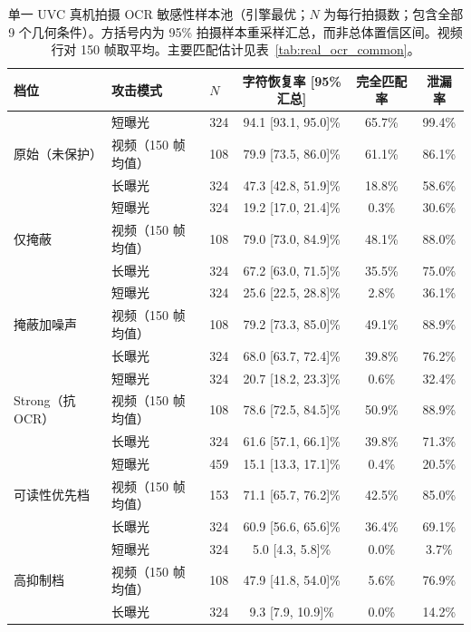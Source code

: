 \documentclass{ieeeaccess}
\begin{document}
\begin{table}[!t]
\caption{单一 UVC 真机拍摄 OCR 敏感性样本池（引擎最优；$N$ 为每行拍摄数；包含全部 9 个几何条件）。方括号内为 95\% 拍摄样本重采样汇总，而非总体置信区间。视频行对 150 帧取平均。主要匹配估计见表~\ref{tab:real_ocr_common}。}
\label{tab:real_ocr_full_pool}
\centering
\footnotesize
\begin{tabular}{lllccc}
\toprule
档位 & 攻击模式 & $N$ & 字符恢复率 [95\% 汇总] & 完全匹配率 & 泄漏率 \\
\midrule
\multirow{3}{*}{原始（未保护）}
 & 短曝光 & 324 & 94.1 [93.1, 95.0]\% & 65.7\% & 99.4\% \\
 & 视频（150 帧均值） & 108 & 79.9 [73.5, 86.0]\% & 61.1\% & 86.1\% \\
 & 长曝光 & 324 & 47.3 [42.8, 51.9]\% & 18.8\% & 58.6\% \\
\midrule
\multirow{3}{*}{仅掩蔽}
 & 短曝光 & 324 & 19.2 [17.0, 21.4]\% & 0.3\% & 30.6\% \\
 & 视频（150 帧均值） & 108 & 79.0 [73.0, 84.9]\% & 48.1\% & 88.0\% \\
 & 长曝光 & 324 & 67.2 [63.0, 71.5]\% & 35.5\% & 75.0\% \\
\midrule
\multirow{3}{*}{掩蔽加噪声}
 & 短曝光 & 324 & 25.6 [22.5, 28.8]\% & 2.8\% & 36.1\% \\
 & 视频（150 帧均值） & 108 & 79.2 [73.3, 85.0]\% & 49.1\% & 88.9\% \\
 & 长曝光 & 324 & 68.0 [63.7, 72.4]\% & 39.8\% & 76.2\% \\
\midrule
\multirow{3}{*}{Strong（抗 OCR）}
 & 短曝光 & 324 & 20.7 [18.2, 23.3]\% & 0.6\% & 32.4\% \\
 & 视频（150 帧均值） & 108 & 78.6 [72.5, 84.5]\% & 50.9\% & 88.9\% \\
 & 长曝光 & 324 & 61.6 [57.1, 66.1]\% & 39.8\% & 71.3\% \\
\midrule
\multirow{3}{*}{可读性优先档}
 & 短曝光 & 459 & 15.1 [13.3, 17.1]\% & 0.4\% & 20.5\% \\
 & 视频（150 帧均值） & 153 & 71.1 [65.7, 76.2]\% & 42.5\% & 85.0\% \\
 & 长曝光 & 324 & 60.9 [56.6, 65.6]\% & 36.4\% & 69.1\% \\
\midrule
\multirow{3}{*}{高抑制档}
 & 短曝光 & 324 & 5.0 [4.3, 5.8]\% & 0.0\% & 3.7\% \\
 & 视频（150 帧均值） & 108 & 47.9 [41.8, 54.0]\% & 5.6\% & 76.9\% \\
 & 长曝光 & 324 & 9.3 [7.9, 10.9]\% & 0.0\% & 14.2\% \\
\bottomrule
\end{tabular}
\end{table}
\end{document}
